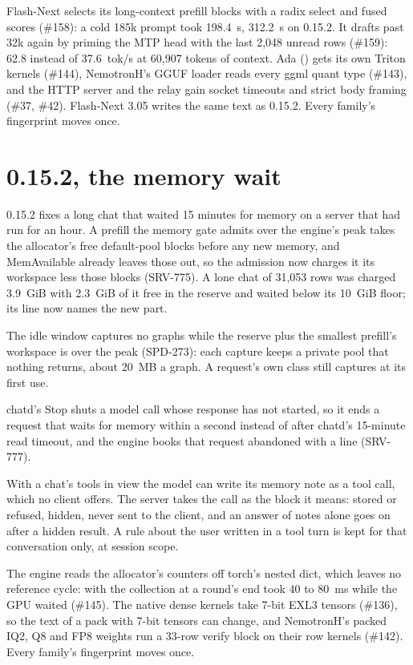 Flash-Next selects its long-context prefill blocks with a radix select and fused scores (\#158): a cold 185k prompt took 198.4~s, 312.2~s on 0.15.2. It drafts past 32k again by priming the MTP head with the last 2,048 unread rows (\#159): 62.8 instead of 37.6~tok/s at 60,907 tokens of context. Ada () gets its own Triton kernels (\#144), NemotronH's GGUF loader reads every ggml quant type (\#143), and the HTTP server and the relay gain socket timeouts and strict body framing (\#37, \#42). Flash-Next 3.05 writes the same text as 0.15.2. Every family's fingerprint moves once.

\section{0.15.2, the memory wait}\label{sec:changelog-0152}

0.15.2 fixes a long chat that waited 15 minutes for memory on a server that had run for an hour. A prefill the memory gate admits over the engine's peak takes the allocator's free default-pool blocks before any new memory, and MemAvailable already leaves those out, so the admission now charges it its workspace less those blocks (SRV-775). A lone chat of 31,053 rows was charged 3.9~GiB with 2.3~GiB of it free in the reserve and waited below its 10~GiB floor; its line now names the new part.

The idle window captures no graphs while the reserve plus the smallest prefill's workspace is over the peak (SPD-273): each capture keeps a private pool that nothing returns, about 20~MB a graph. A request's own class still captures at its first use.

chatd's Stop shuts a model call whose response has not started, so it ends a request that waits for memory within a second instead of after chatd's 15-minute read timeout, and the engine books that request abandoned with a \code{[req]} line (SRV-777).

With a chat's tools in view the model can write its memory note as a  tool call, which no client offers. The server takes the call as the block it means: stored or refused, hidden, never sent to the client, and an answer of notes alone goes on after a hidden result. A rule about the user written in a tool turn is kept for that conversation only, at session scope.

The engine reads the allocator's counters off torch's nested dict, which leaves no reference cycle: with  the collection at a round's end took 40 to 80~ms while the GPU waited (\#145). The native dense kernels take 7-bit EXL3 tensors (\#136), so the text of a pack with 7-bit tensors can change, and NemotronH's packed IQ2, Q8 and FP8 weights run a 33-row verify block on their row kernels (\#142). Every family's fingerprint moves once.

